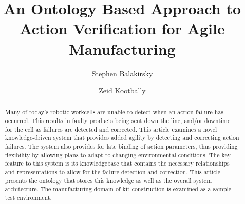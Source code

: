 \documentclass{llncs}
\begin{document}
%
\frontmatter          %
%
\pagestyle{headings}  %
%
%
\mainmatter              %
%
\title{An Ontology Based Approach to Action Verification for Agile Manufacturing}
%
%
\author{Stephen Balakirsky \and Zeid Kootbally}
%
%
%

\maketitle              %

\begin{abstract}
Many of today’s robotic workcells are unable to detect when an action failure has occurred. This results in faulty products being sent down the line, and/or downtime for the cell as failures are detected and corrected. This article examines a novel knowledge-driven system that provides added agility by detecting and correcting action failures. The system also provides for late binding of action parameters, thus providing flexibility by allowing plans to adapt to changing environmental conditions. The key feature to this system is its knowledgebase that contains the necessary relationships and representations to allow for the failure detection and correction. This article presents the ontology that stores this knowledge as well as the overall system architecture. The manufacturing domain of kit construction is examined as a sample test environment. 
\end{abstract}
%
%





%
%



%
%


\clearpage
{} %
\renewcommand{\indexname}{Author Index}
\printindex
\clearpage
{} %
\renewcommand{\indexname}{Subject Index}
%
\end{document}
